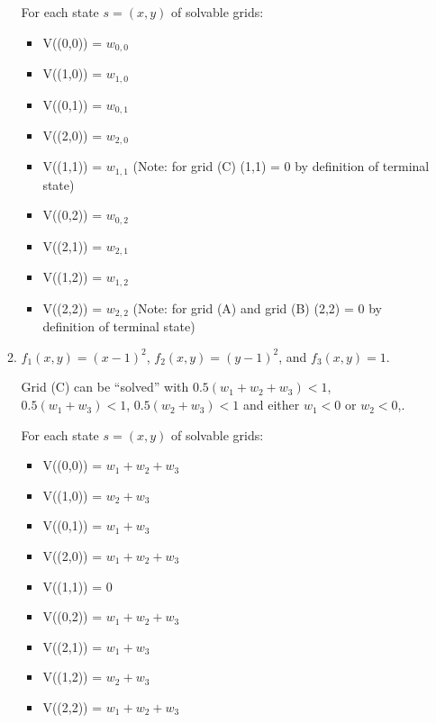 \documentclass[12pt]{article}
\begin{document}
\begin{enumerate}
\begin{enumerate}
  For each state $s = (x, y)$ of solvable grids: 
  \begin{itemize}
    \item V((0,0)) = $w_{0,0}$
    \item V((1,0)) = $w_{1,0}$
    \item V((0,1)) = $w_{0,1}$
    \item V((2,0)) = $w_{2,0}$
    \item V((1,1)) = $w_{1,1}$ (Note: for grid (C) (1,1) = 0 by definition of terminal state)
    \item V((0,2)) = $w_{0,2}$
    \item V((2,1)) = $w_{2,1}$
    \item V((1,2)) = $w_{1,2}$
    \item V((2,2)) = $w_{2,2}$ (Note: for grid (A) and grid (B) (2,2) = 0 by definition of terminal state)
  \end{itemize}


  \item $f_1(x, y) = (x - 1)^2$, $f_2(x, y) = (y - 1)^2$, and $f_3(x, y) = 1$.

  Grid (C) can be ``solved'' with  $0.5(w_1 + w_2 + w_3) < 1$, $0.5(w_1 + w_3) < 1$, $0.5(w_2 + w_3) < 1$ and either $w_1 < 0$ or $w_2 < 0$,.

  For each state $s = (x, y)$ of solvable grids: 
  \begin{itemize}
    \item V((0,0)) = $w_1 + w_2 + w_3$
    \item V((1,0)) = $w_2 + w_3$
    \item V((0,1)) = $w_1 + w_3$
    \item V((2,0)) = $w_1 + w_2 + w_3$
    \item V((1,1)) = 0 
    \item V((0,2)) = $w_1 + w_2 + w_3$
    \item V((2,1)) = $w_1 + w_3$
    \item V((1,2)) = $w_2 + w_3$
    \item V((2,2)) = $w_1 + w_2 + w_3$
  \end{itemize}

  \end{enumerate}

\end{enumerate}
\end{document}

